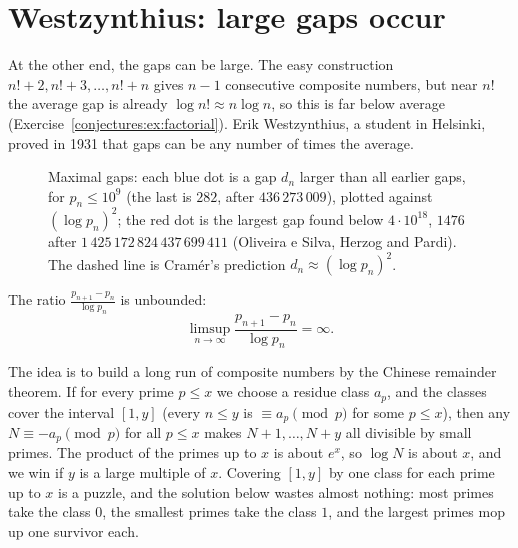 \section{Westzynthius: large gaps occur}

At the other end, the gaps can be large. The easy construction $n!+2,n!+3,\dots,n!+n$ gives $n-1$ consecutive composite numbers, but near
$n!$ the average gap is already $\log n!\approx n\log n$, so this is far below average (Exercise~\ref{conjectures:ex:factorial}). Erik Westzynthius, a student in
Helsinki, proved in 1931 that gaps can be any number of times the average.

\begin{figure}[ht]
\centering
{}
\caption{Maximal gaps: each blue dot is a gap $d_n$ larger than all earlier gaps, for $p_n\le10^9$ (the last is $282$, after $436\,273\,009$), plotted
against $(\log p_n)^2$; the red dot is the largest gap found below $4\cdot10^{18}$, $1476$ after $1\,425\,172\,824\,437\,699\,411$ (Oliveira e Silva, Herzog
and Pardi). The dashed line is Cram\'er's prediction $d_n\approx(\log p_n)^2$.}
\label{conjectures:fig:gaps}
\end{figure}

\begin{theorem}[Westzynthius, 1931]\label{conjectures:thm:westzynthius}
The ratio $\frac{p_{n+1}-p_n}{\log p_n}$ is unbounded:
\[
\limsup_{n\to\infty}\frac{p_{n+1}-p_n}{\log p_n}=\infty.
\]
\end{theorem}

The idea is to build a long run of composite numbers by the Chinese remainder theorem. If for every prime $p\le x$ we choose a residue class $a_p$,
and the classes cover the interval $[1,y]$ (every $n\le y$ is $\equiv a_p\pmod p$ for some $p\le x$), then any $N\equiv-a_p\pmod p$ for all $p\le x$ makes
$N+1,\dots,N+y$ all divisible by small primes. The product of the primes up to $x$ is about $e^x$, so $\log N$ is about $x$, and we win if $y$ is a large
multiple of $x$. Covering $[1,y]$ by one class for each prime up to $x$ is a puzzle, and the solution below wastes almost nothing: most primes
take the class $0$, the smallest primes take the class $1$, and the largest primes mop up one survivor each.

